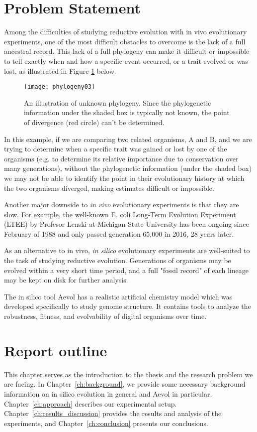 \section{Problem Statement} \label{problem_statement}
Among the difficulties of studying reductive evolution with in vivo evolutionary experiments, one of the most difficult obstacles to overcome is the lack of a full ancestral record. This lack of a full phylogeny can make it difficult or impossible to tell exactly when and how a specific event occurred, or a trait evolved or was lost, as illustrated in Figure \ref{fig:phylogeny03} below. 
\begin{figure}[h]\label{fig:phylogeny03}
\texttt{[image: phylogeny03]}
\centering
\caption{An illustration of unknown phylogeny. Since the phylogenetic information under the shaded box is typically not known, the point of divergence (red circle) can't be determined.}
\end{figure}
In this example, if we are comparing two related organisms, A and B, and we are trying to determine when a specific trait was gained or lost by one of the organisms (e.g. to determine its relative importance due to conservation over many generations), without the phylogenetic information (under the shaded box) we may not be able to identify the point in their evolutionary history at which the two organisms diverged, making estimates difficult or impossible.

Another major downside to \textit{in vivo} evolutionary experiments is that they are slow. For example, the well-known E. coli Long-Term Evolution Experiment (LTEE) by Profesor Lenski at Michigan State University has been ongoing since February of 1988 and only passed generation 65,000 in 2016, 28 years later. 

As an alternative to in vivo, \textit{in silico} evolutionary experiments are well-suited to the task of studying reductive evolution. Generations of organisms may be evolved within a very short time period, and a full "fossil record" of each lineage may be kept on disk for further analysis. 

The in silico tool Aevol has a realistic artificial chemistry model which was developed specifically to study genome structure. It contains tools to analyze the robustness, fitness, and evolvability of digital organisms over time.  

\section{Report outline}
This chapter serves as the introduction to the thesis and the research problem we are facing. In Chapter~\ref{ch:background}, we provide some necessary background information on in silico evolution in general and Aevol in particular. Chapter~\ref{ch:approach} describes our experimental setup. Chapter~\ref{ch:results_discussion}
provides the results and analysis of the experiments, and Chapter~\ref{ch:conclusion} presents our conclusions. 


